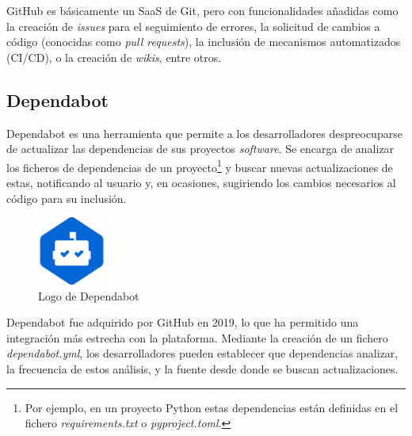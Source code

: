 GitHub es básicamente un SaaS de Git, pero con funcionalidades añadidas como la creación de \emph{issues} para el seguimiento de errores, la solicitud de cambios a código (conocidas como \emph{pull requests}), la inclusión de mecanismos automatizados (CI/CD), o la creación de \emph{wikis}, entre otros. \emph{\parencite{Reference22}}

\subsection{Dependabot}

Dependabot es una herramienta que permite a los desarrolladores despreocuparse de actualizar las dependencias de sus proyectos \emph{software}. Se encarga de analizar los ficheros de dependencias de un proyecto\footnote{Por ejemplo, en un proyecto Python estas dependencias están definidas en el fichero \emph{requirements.txt} o \emph{pyproject.toml}.} y buscar nuevas actualizaciones de estas, notificando al usuario y, en ocasiones, sugiriendo los cambios necesarios al código para su inclusión. \emph{\parencite{Reference24}}

\begin{figure}[ht]
    \centering
    \includegraphics[width=0.2\textwidth]{Figures/dependabot-logo}
    \decoRule
    \caption[Dependabot (Logo)]{Logo de Dependabot \emph{\parencite{Reference25}}}
    \label{fig:dependabot-logo}
\end{figure}

Dependabot fue adquirido por GitHub en 2019, lo que ha permitido una integración más estrecha con la plataforma. Mediante la creación de un fichero \emph{dependabot.yml}, los desarrolladores pueden establecer que dependencias analizar, la frecuencia de estos análisis, y la fuente desde donde se buscan actualizaciones. \emph{\parencite{Reference24}}
